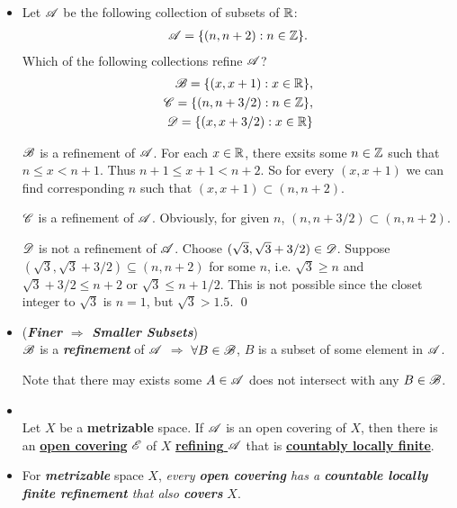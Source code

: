 \documentclass[11pt]{article}
\begin{document}
\begin{itemize}
\item \begin{exercise}
Let ${\mathscr A}$ be the following collection of subsets of ${\mathbb R}$:
\begin{align*}
{\mathscr A} = \{(n, n + 2): n \in {\mathbb Z}\}.
\end{align*}
Which of the following collections refine ${\mathscr A}$?
\begin{align*}
{\mathscr B} = \{(x, x + 1): x \in {\mathbb R}\},\\
{\mathscr C} = \{(n, n + 3/2): n \in {\mathbb Z}\},\\
{\mathscr D} = \{(x, x + 3/2): x \in {\mathbb R} \}
\end{align*}
\end{exercise}
\begin{solution}
${\mathscr B}$ is a refinement of ${\mathscr A}$. For each $x \in {\mathbb R}$, there exsits some $n \in {\mathbb Z}$ such that $n \le x < n+1$. Thus $n+1 \le x + 1 < n+2$. So for every $(x, x+1)$ we can find corresponding $n$ such that $(x, x+1) \subset (n, n+2)$.

${\mathscr C}$ is a refinement of ${\mathscr A}$. Obviously, for given $n$, $(n, n+3/2) \subset (n, n+2)$.

${\mathscr D}$ is not a refinement of ${\mathscr A}$. Choose $(\sqrt{3}, \sqrt{3}+ 3/2) \in {\mathscr D}$. Suppose $(\sqrt{3}, \sqrt{3}+ 3/2) \subseteq (n, n+2)$ for some $n$, i.e. $\sqrt{3} \ge n$ and $\sqrt{3} + 3/2 \le n+2$ or $\sqrt{3} \le n+ 1/2$. This is not possible since the closet integer to $\sqrt{3}$ is $n=1$, but $\sqrt{3} > 1.5$. \qed
\end{solution}

\item \begin{remark} (\emph{\textbf{Finer $\Rightarrow$ Smaller Subsets}})\\
${\mathscr B}$ is a \emph{\textbf{refinement}} of ${\mathscr A}$ $\Rightarrow$ $\forall B \in {\mathscr B}$, $B$ is a subset of some element in ${\mathscr A}$.

Note that there may exists some $A \in {\mathscr A}$ does not intersect with any $B \in {\mathscr B}$.
\end{remark}

\item \begin{theorem}  \citep{munkres2000topology}\\
Let $X$ be a \textbf{metrizable} space. If ${\mathscr A}$ is an open covering of $X$, then there is an \underline{\textbf{open covering}} ${\mathscr E}$ of $X$ \underline{\textbf{refining} ${\mathscr A}$} that is \underline{\textbf{countably locally finite}}.
\end{theorem}

\item \begin{remark}
For \emph{\textbf{metrizable}} space $X$, \emph{every \textbf{open covering} has a \textbf{countable locally finite refinement} that also \textbf{covers}} $X$.
\end{remark}
\end{itemize}
\end{document}
